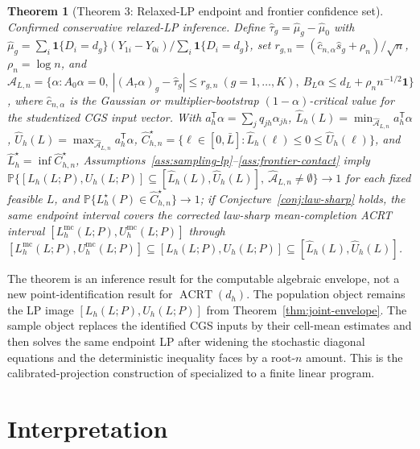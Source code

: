 \documentclass[11pt]{article}
\renewcommand{\Pr}{\mathbb{P}}
\newcommand{\one}{\mathbf{1}}
\newcommand{\transpose}{\mathsf{T}}
\theoremstyle{definition}
\theoremstyle{plain}
\newtheorem{theorem}{Theorem}
\theoremstyle{remark}
\begin{document}
\begin{theorem}[Theorem 3: Relaxed-LP endpoint and frontier confidence set]\label{thm:plugin-inference}\label{conj:plugin-inference}
Confirmed conservative relaxed-LP inference. Define \(\widehat\tau_g=\widehat\mu_g-\widehat\mu_0\) with \(\widehat\mu_g=\sum_i\one\{D_i=d_g\}(Y_{1i}-Y_{0i})/\sum_i\one\{D_i=d_g\}\), set \(r_{g,n}=(\widehat c_{n,\alpha}\widehat s_g+\rho_n)/\sqrt n\), \(\rho_n=\log n\), and \(\widehat{\mathcal A}_{L,n}=\{\alpha:A_0\alpha=0,\ |(A_\tau\alpha)_g-\widehat\tau_g|\le r_{g,n}\ (g=1,\ldots,K),\ B_L\alpha\le d_L+\rho_n n^{-1/2}\one\}\), where \(\widehat c_{n,\alpha}\) is the Gaussian or multiplier-bootstrap \((1-\alpha)\)-critical value for the studentized CGS input vector. With \(a_h^\transpose\alpha=\sum_jq_{jh}\alpha_{jh}\), \(\widehat L_h(L)=\min_{\widehat{\mathcal A}_{L,n}}a_h^\transpose\alpha\), \(\widehat U_h(L)=\max_{\widehat{\mathcal A}_{L,n}}a_h^\transpose\alpha\), \(\widehat C_{h,n}^\star=\{\ell\in[0,\bar L]:\widehat L_h(\ell)\le0\le\widehat U_h(\ell)\}\), and \(\widehat L_h^\star=\inf\widehat C_{h,n}^\star\), Assumptions~\ref{ass:sampling-lp}--\ref{ass:frontier-contact} imply \(\Pr\{[L_h(L;P),U_h(L;P)]\subseteq[\widehat L_h(L),\widehat U_h(L)],\ \widehat{\mathcal A}_{L,n}\ne\emptyset\}\to1\) for each fixed feasible \(L\), and \(\Pr\{L_h^\star(P)\in\widehat C_{h,n}^\star\}\to1\); if Conjecture~\ref{conj:law-sharp} holds, the same endpoint interval covers the corrected law-sharp mean-completion ACRT interval \([L_h^{\mathrm{mc}}(L;P),U_h^{\mathrm{mc}}(L;P)]\) through \([L_h^{\mathrm{mc}}(L;P),U_h^{\mathrm{mc}}(L;P)]\subseteq[L_h(L;P),U_h(L;P)]\subseteq[\widehat L_h(L),\widehat U_h(L)]\).
\end{theorem}

The theorem is an inference result for the computable algebraic envelope, not a new point-identification result for \(\operatorname{ACRT}(d_h)\).  The population object remains the LP image \([L_h(L;P),U_h(L;P)]\) from Theorem~\ref{thm:joint-envelope}.  The sample object replaces the identified CGS inputs by their cell-mean estimates and then solves the same endpoint LP after widening the stochastic diagonal equations and the deterministic inequality faces by a root-\(n\) amount.  This is the calibrated-projection construction of \cite{KaidoMolinariStoye2019} specialized to a finite linear program.

\section{Interpretation}
\end{document}
